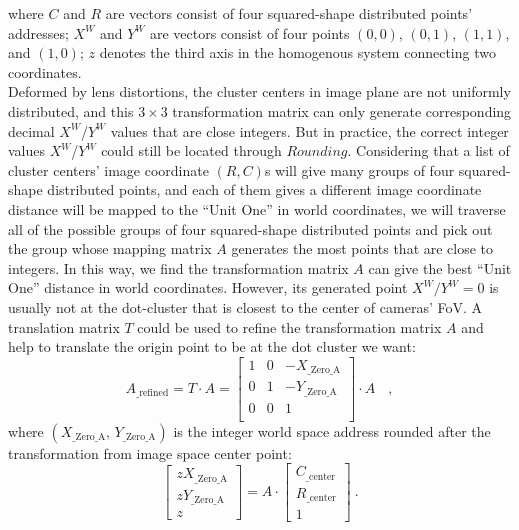 %
\noindent
where \(C\) and \(R\) are vectors consist of four squared-shape distributed points' addresses; \(X^W\) and \(Y^W\) are vectors consist of four points \((0, 0)\), \((0, 1)\), \((1, 1)\), and \((1, 0)\); \(z\) denotes the third axis in the homogenous system connecting two coordinates. %
\\\indent%
Deformed by lens distortions, the cluster centers in image plane are not uniformly distributed, and this $3\times3$ transformation matrix can only generate corresponding decimal \(X^W\)/\(Y^W\) values that are close integers. But in practice, the correct integer values \(X^W\)/\(Y^W\) could still be located through \(Rounding\). Considering that a list of cluster centers' image coordinate \((R, C)\)s will give many groups of four squared-shape distributed points, and each of them gives a different image coordinate distance will be mapped to the \enquote{Unit One} in world coordinates, we will traverse all of the possible groups of four squared-shape distributed points and pick out the group whose mapping matrix \(A\) generates the most points that are close to integers. %
%
In this way, we find the transformation matrix \(A\) can give the best \enquote{Unit One} distance in world coordinates. However, its generated point \(X^W/Y^W = 0\) is usually not at the dot-cluster that is closest to the center of cameras' FoV. A translation matrix \(T\) could be used to refine the transformation matrix \(A\) and help to translate the origin point to be at the dot cluster we want:%
%
\begin{equation}
%
A_{\text{\_refined}}%
= %
T \cdot A %
= %
\begin{bmatrix} 
1 & 0 & -X_{\text{\_Zero\_A}} \\%
0 & 1 & -Y_{\text{\_Zero\_A}} \\%
0 & 0 &   1 \\%
\end{bmatrix}%
\cdot A%
\, \, \, \ \ ,%
\end{equation}%
%
where \((X_{\text{\_Zero\_A}}, \, Y_{\text{\_Zero\_A}})\) is the integer world space address rounded after the transformation from image space center point:%
%
\begin{equation}
%
\left[ \begin{array}{c} %
zX_{\text{\_Zero\_A}} \\ zY_{\text{\_Zero\_A}} \\ z \end{array} \right] %
= %
A\cdot \left[ \begin{array}{c} %
C_{\text{\_center}} \\ R_{\text{\_center}} \\ 1 \end{array} \right] %
 \ .%
\end{equation}%
